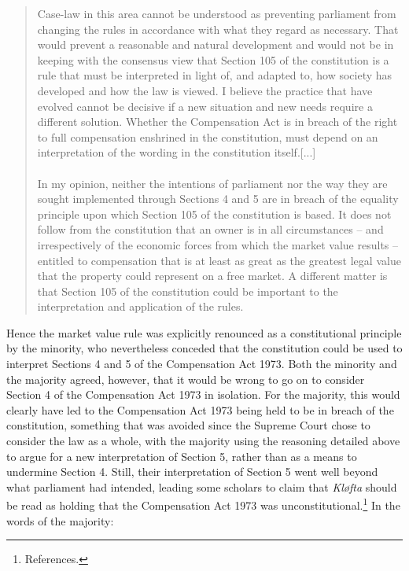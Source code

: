 \begin{quote}
Case-law in this area cannot be understood as preventing parliament from changing the rules in accordance with what they regard as necessary. That would prevent a reasonable and natural development and would not be in keeping with the consensus view that Section 105 of the constitution is a rule that must be interpreted in light of, and adapted to, how society has developed and how the law is viewed. I believe the practice that have evolved cannot be decisive if a new situation and new needs require a different solution. Whether the Compensation Act is in breach of the right to full compensation enshrined in the constitution, must depend on an interpretation of the wording in the constitution itself.[...] \\ \\
In my opinion, neither the intentions of parliament nor the way they are sought implemented through Sections 4 and 5 are in breach of the equality principle upon which Section 105 of the constitution is based. It does not follow from the constitution that an owner is in all circumstances -- and irrespectively of the economic forces from which the market value results -- entitled to compensation that is at least as great as the greatest legal value that the property could represent on a free market. A different matter is that Section 105 of the constitution could be important to the interpretation and application of the rules.
\end{quote} 

Hence the market value rule was explicitly renounced as a constitutional principle by the minority, who nevertheless conceded that the constitution could be used to interpret Sections 4 and 5 of the Compensation Act 1973. Both the minority and the majority agreed, however, that  it would be wrong to go on to consider Section 4 of the Compensation Act 1973 in isolation. For the majority, this would clearly have led to the Compensation Act 1973 being held to be in breach of the constitution, something that was avoided since the Supreme Court chose to consider the law as a whole, with the majority using the reasoning detailed above to argue for a new interpretation of Section 5, rather than as a means to undermine Section 4. Still, their interpretation of Section 5 went well beyond what parliament had intended, leading some scholars to claim that \emph{Kløfta} should be read as holding that the Compensation Act 1973 was unconstitutional.\footnote{References.} In the words of the majority:

